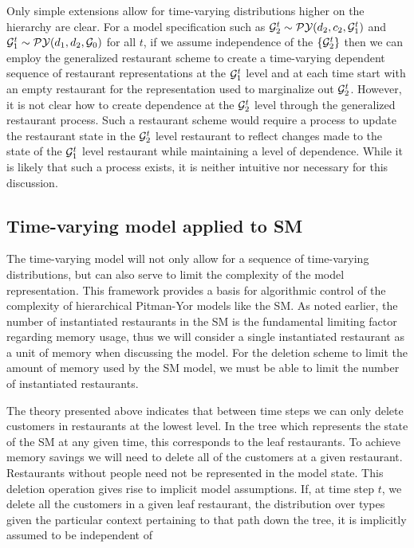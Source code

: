 Only simple extensions allow for time-varying distributions higher on the hierarchy are clear.  For a model specification such as $\G_2^t \sim \PY(d_2, c_2, \G_1^t)$ and $\G_1^t  \sim \PY(d_1,d_2,\G_0)$ for all $t$, if we assume independence of the $\{ \G_2^t \}$ then we can employ the generalized restaurant scheme to create a time-varying dependent sequence of restaurant representations at the  $\G_1^t$ level and at each time start with an empty restaurant for the representation used to marginalize out $\G_2^t$.  However, it is not clear how to create dependence at the $\G_2^t$ level through the generalized restaurant process.  Such a restaurant scheme would require a process to update the restaurant state in the $\G_2^t$ level restaurant to reflect changes made to the state of the $\G_1^t$ level restaurant while maintaining a level of dependence.  While it is likely that such a process exists, it is neither intuitive nor necessary for this discussion.

\subsection{Time-varying model applied to SM}

The time-varying model will not only allow for a sequence of time-varying distributions, but can also serve to limit the complexity of the model representation. This framework provides a basis for algorithmic control of the complexity of hierarchical Pitman-Yor models like the SM.  As noted earlier, the number of instantiated restaurants in the SM is the fundamental limiting factor regarding memory usage, thus we will consider a single instantiated restaurant as a unit of memory when discussing the model. For the deletion scheme to limit the amount of memory used by the SM model, we must be able to limit the number of instantiated restaurants.

The theory presented above indicates that between time steps we can only delete customers in restaurants at the lowest level.  In the tree which represents the state of the SM at any given time, this corresponds to the leaf restaurants.  To achieve memory savings we will need to delete all of the customers at a given restaurant.  Restaurants without people need not be represented in the model state.  This deletion operation gives rise to implicit model assumptions. If, at time step $t$, we delete all the customers in a given leaf restaurant, the distribution over types given the particular context pertaining to that path down the tree, it is implicitly assumed to be independent of

